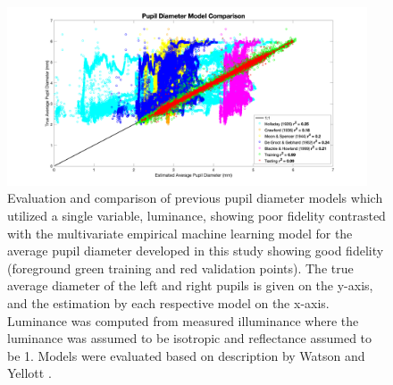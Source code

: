 \documentclass[10pt]{article}
\begin{document}
\begin{figure}[!t]
    \centering
    \includegraphics[width=0.95\textwidth]{./scatterPlots/OldModelsPlot.png}
    \caption{Evaluation and comparison of previous pupil diameter models which utilized a single variable, luminance, showing poor fidelity contrasted with the multivariate empirical machine learning model for the average pupil diameter developed in this study showing good fidelity (foreground green training and red validation points). The true average diameter of the left and right pupils is given on the y-axis, and the estimation by each respective model on the x-axis. Luminance was computed from measured illuminance where the luminance was assumed to be isotropic and reflectance assumed to be 1. Models were evaluated based on description by Watson and Yellott \cite{PupilModels}.}
    \label{fig:oldModels}
\end{figure}
\end{document}
